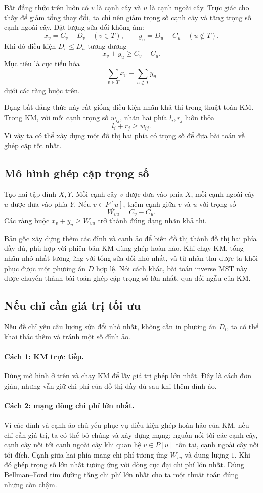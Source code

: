 \documentclass[11pt]{article}
\begin{document}
Bất đẳng thức trên luôn có $v$ là cạnh cây và $u$ là cạnh ngoài cây. Trực giác
cho thấy để giảm tổng thay đổi, ta chỉ nên giảm trọng số cạnh cây và tăng
trọng số cạnh ngoài cây. Đặt lượng sửa đổi không âm:
\[
  x_v=C_v-D_v\quad (v\in T),\qquad
  y_u=D_u-C_u\quad (u\notin T).
\]
Khi đó điều kiện $D_v\le D_u$ tương đương
\[
  x_v+y_u\ge C_v-C_u.
\]
Mục tiêu là cực tiểu hóa
\[
  \sum_{v\in T}x_v+\sum_{u\notin T}y_u
\]
dưới các ràng buộc trên.

Dạng bất đẳng thức này rất giống điều kiện nhãn khả thi trong thuật toán KM.
Trong KM, với mỗi cạnh trọng số $w_{ij}$, nhãn hai phía $l_i,r_j$ luôn thỏa
\[
  l_i+r_j\ge w_{ij}.
\]
Vì vậy ta có thể xây dựng một đồ thị hai phía có trọng số để đưa bài toán về
ghép cặp tốt nhất.

\subsection{Mô hình ghép cặp trọng số}

Tạo hai tập đỉnh $X,Y$. Mỗi cạnh cây $v$ được đưa vào phía $X$, mỗi cạnh
ngoài cây $u$ được đưa vào phía $Y$. Nếu $v\in P[u]$, thêm cạnh giữa $v$ và
$u$ với trọng số
\[
  W_{vu}=C_v-C_u.
\]
Các ràng buộc $x_v+y_u\ge W_{vu}$ trở thành đúng dạng nhãn khả thi.

Bản gốc xây dựng thêm các đỉnh và cạnh ảo để biến đồ thị thành đồ thị hai phía
đầy đủ, phù hợp với phiên bản KM dùng ghép hoàn hảo. Khi chạy KM, tổng nhãn
nhỏ nhất tương ứng với tổng sửa đổi nhỏ nhất, và từ nhãn thu được ta khôi phục
được một phương án $D$ hợp lệ. Nói cách khác, bài toán inverse MST này được
chuyển thành bài toán ghép cặp trọng số lớn nhất, qua đối ngẫu của KM.

\subsection{Nếu chỉ cần giá trị tối ưu}

Nếu đề chỉ yêu cầu lượng sửa đổi nhỏ nhất, không cần in phương án $D_i$, ta có
thể khai thác thêm và tránh một số đỉnh ảo.

\paragraph{Cách 1: KM trực tiếp.}
Dùng mô hình ở trên và chạy KM để lấy giá trị ghép lớn nhất. Đây là cách đơn
giản, nhưng vẫn giữ chi phí của đồ thị đầy đủ sau khi thêm đỉnh ảo.

\paragraph{Cách 2: mạng dòng chi phí lớn nhất.}
Vì các đỉnh và cạnh ảo chủ yếu phục vụ điều kiện ghép hoàn hảo của KM, nếu
chỉ cần giá trị, ta có thể bỏ chúng và xây dựng mạng:
nguồn nối tới các cạnh cây, cạnh cây nối tới cạnh ngoài cây khi quan hệ
$v\in P[u]$ tồn tại, cạnh ngoài cây nối tới đích. Cạnh giữa hai phía mang chi
phí tương ứng $W_{vu}$ và dung lượng $1$. Khi đó ghép trọng số lớn nhất tương
ứng với dòng cực đại chi phí lớn nhất. Dùng Bellman--Ford tìm đường tăng chi
phí lớn nhất cho ta một thuật toán đúng nhưng còn chậm.
\end{document}
